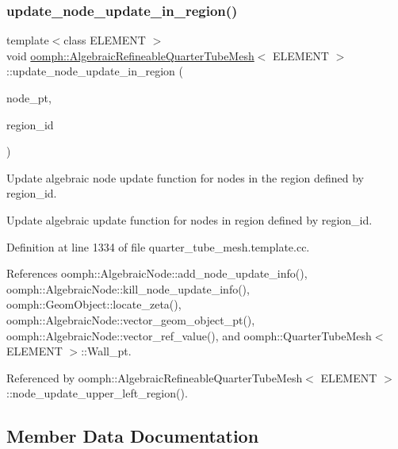 \subsubsection{\texorpdfstring{update\+\_\+node\+\_\+update\+\_\+in\+\_\+region()}{update\_node\_update\_in\_region()}}
{\footnotesize\ttfamily template$<$class E\+L\+E\+M\+E\+NT $>$ \\
void \hyperlink{classoomph_1_1AlgebraicRefineableQuarterTubeMesh}{oomph\+::\+Algebraic\+Refineable\+Quarter\+Tube\+Mesh}$<$ E\+L\+E\+M\+E\+NT $>$\+::update\+\_\+node\+\_\+update\+\_\+in\+\_\+region (\begin{DoxyParamCaption}\item[{\hyperlink{classoomph_1_1AlgebraicNode}{Algebraic\+Node} $\ast$\&}]{node\+\_\+pt,  }\item[{int \&}]{region\+\_\+id }\end{DoxyParamCaption})\hspace{0.3cm}{\ttfamily [private]}}



Update algebraic node update function for nodes in the region defined by region\+\_\+id. 

Update algebraic update function for nodes in region defined by region\+\_\+id. 

Definition at line 1334 of file quarter\+\_\+tube\+\_\+mesh.\+template.\+cc.



References oomph\+::\+Algebraic\+Node\+::add\+\_\+node\+\_\+update\+\_\+info(), oomph\+::\+Algebraic\+Node\+::kill\+\_\+node\+\_\+update\+\_\+info(), oomph\+::\+Geom\+Object\+::locate\+\_\+zeta(), oomph\+::\+Algebraic\+Node\+::vector\+\_\+geom\+\_\+object\+\_\+pt(), oomph\+::\+Algebraic\+Node\+::vector\+\_\+ref\+\_\+value(), and oomph\+::\+Quarter\+Tube\+Mesh$<$ E\+L\+E\+M\+E\+N\+T $>$\+::\+Wall\+\_\+pt.



Referenced by oomph\+::\+Algebraic\+Refineable\+Quarter\+Tube\+Mesh$<$ E\+L\+E\+M\+E\+N\+T $>$\+::node\+\_\+update\+\_\+upper\+\_\+left\+\_\+region().



\subsection{Member Data Documentation}
\mbox{\label{classoomph_1_1AlgebraicRefineableQuarterTubeMesh_a6006bcac5688f832ff2b6cbaae65102a}} 
